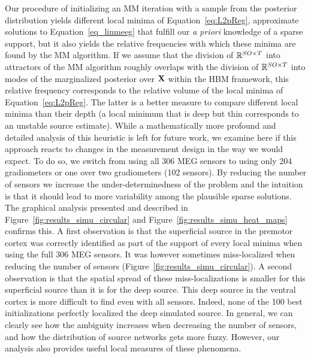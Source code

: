 Our procedure of initializing an MM iteration with a sample from the posterior distribution yields different local minima of Equation~\eqref{eq:L2pReg}, \ie approximate solutions to Equation~\eqref{eq_linmeeg} that fulfill our \emph{a priori} knowledge of a sparse support, but it also yields the relative frequencies with which these minima are found by the MM algorithm. If we assume that the division of $\mathbb{R}^{SO\times T}$ into attractors of the MM algorithm roughly overlaps with the division of $\mathbb{R}^{SO\times T}$ into modes of the marginalized posterior over $\mathbf{X}$ within the HBM framework, this relative frequency corresponds to the relative volume of the local minima of Equation~\eqref{eq:L2pReg}. The latter is a better measure to compare different local minima than their depth (a local minimum that is deep but thin corresponds to an unstable source estimate). While a mathematically more profound and detailed analysis of this heuristic is left for future work, we examine here if this approach reacts to changes in the measurement design in the way we would expect. To do so, we switch from using all 306 MEG sensors to using only 204 gradiometers or one over two gradiometers (102 sensors). By reducing the number of sensors we increase the under-determinedness of the problem and the intuition is that it should lead to
more variability among the plausible sparse solutions. The graphical analysis presented and described in Figure~\ref{fig:results_simu_circular} and Figure~\ref{fig:results_simu_heat_maps} confirms this. A first observation is that the superficial source in the premotor cortex was correctly identified as part of the support of every local minima when using the full 306 MEG sensors. It was however sometimes miss-localized when reducing the number of sensors (Figure~\ref{fig:results_simu_circular}). A second observation is that the spatial spread of these miss-localizations is smaller for this superficial source than it is for the deep source. This deep source in the ventral cortex is more difficult to find even with all sensors. Indeed, none of the 100 best initializations perfectly localized the deep simulated source. In general, we can clearly see how the ambiguity increases when decreasing the number of sensors, and how the distribution of source networks gets more fuzzy. However, our analysis also provides useful local measures of these phenomena.


